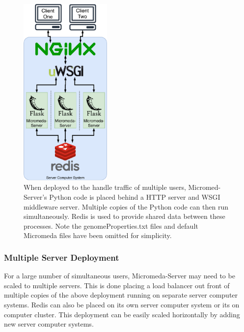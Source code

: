 \begin{figure}[!ht]
  \centering
	\includegraphics[width=0.40\textwidth]{media/micromeda-medium-deployment.pdf}
	 \caption{When deployed to the handle traffic of multiple users, Micromed-Server's Python code is placed behind a HTTP server and WSGI middleware server. Multiple copies of the Python code can then run simultaneously. Redis is used to provide shared data between these processes. Note the genomeProperties.txt files and default Micromeda files have been omitted for simplicity.}
	 \label{fig:micromeda-medium-deploy}
\end{figure}

\subsubsection{Multiple Server Deployment}

For a large number of simultaneous users, Micromeda-Server may need to be scaled to multiple servers. This is done placing a load balancer out front of multiple copies of the above deployment running on separate server computer systems. Redis can also be placed on its own server computer system or its on computer cluster. This deployment can be easily scaled horizontally by adding new server computer systems.

